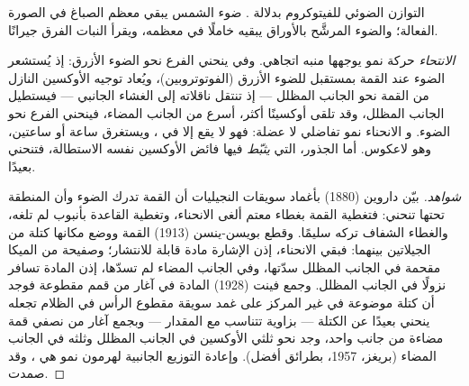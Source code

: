 \begin{omfigure}

{\small التوازن الضوئي للفيتوكروم بدلالة . ضوء الشمس يبقي معظم الصباغ في الصورة الفعالة؛
والضوء المرشَّح بالأوراق يبقيه خاملًا في معظمه، ويقرأ النبات
الفرق جيرانًا.}
\end{omfigure}

\begin{proposition}\label{prop:b2:plant-plasticity:phototropism}
\emph{الانتحاء} حركة نمو يوجهها منبه
اتجاهي. وفي \emph{} ينحني الفرع نحو الضوء الأزرق:
إذ يُستشعر الضوء عند القمة بمستقبل للضوء الأزرق
(الفوتوتروبين)، ويُعاد توجيه الأوكسين النازل من القمة
نحو الجانب المظلل --- إذ تنتقل ناقلاته إلى الغشاء الجانبي
--- فيستطيل الجانب المظلل، وقد تلقى أوكسينًا أكثر، أسرع
من الجانب المضاء، فينحني الفرع نحو الضوء. و
الانحناء نمو تفاضلي لا عضلة: فهو لا يقع إلا في
، ويستغرق ساعة أو ساعتين، وهو لاعكوس.
أما الجذور، التي \emph{يثبّط} فيها فائض الأوكسين نفسه الاستطالة،
فتنحني بعيدًا.
\end{proposition}
\begin{proof}[شواهد]
بيّن داروين (1880) بأغماد سويقات النجيليات أن القمة تدرك
الضوء وأن المنطقة تحتها تنحني: فتغطية القمة بغطاء
معتم ألغى الانحناء، وتغطية القاعدة بأنبوب لم
تلغه، والغطاء الشفاف تركه سليمًا. وقطع بويسن-ينسن (1913)
القمة ووضع مكانها كتلة من الجيلاتين بينهما: فبقي الانحناء،
إذن الإشارة مادة قابلة للانتشار؛ وصفيحة من الميكا
مقحمة في الجانب المظلل سدّتها، وفي الجانب المضاء لم تسدّها، إذن
المادة تسافر نزولًا في الجانب المظلل. وجمع فينت (1928)
المادة في آغار من قمم مقطوعة فوجد أن كتلة موضوعة
في غير المركز على غمد سويقة مقطوع الرأس في الظلام تجعله ينحني
بعيدًا عن الكتلة --- بزاوية تتناسب مع المقدار ---
وبجمع آغار من نصفي قمة مضاءة من جانب واحد،
وجد نحو ثلثي الأوكسين في الجانب المظلل وثلثه
في الجانب المضاء (بريغز، 1957، بطرائق أفضل). وإعادة
التوزيع الجانبية لهرمون نمو هي ،
وقد صمدت.
\end{proof}

